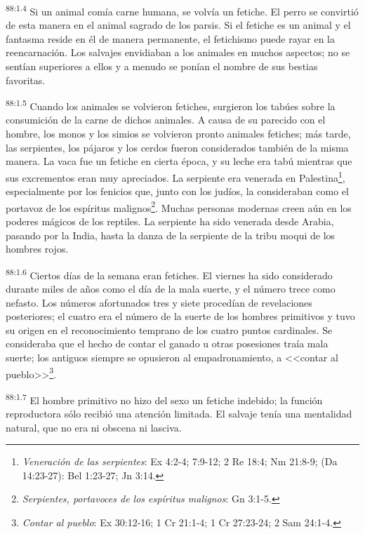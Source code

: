 \documentclass[twoside, 11pt]{book}
\begin{document}
\par
\textsuperscript{88:1.4} Si un animal comía carne humana, se volvía un fetiche. El perro se convirtió de esta manera en el animal sagrado de los parsis. Si el fetiche es un animal y el fantasma reside en él de manera permanente, el fetichismo puede rayar en la reencarnación. Los salvajes envidiaban a los animales en muchos aspectos; no se sentían superiores a ellos y a menudo se ponían el nombre de sus bestias favoritas.

\par
\textsuperscript{88:1.5} Cuando los animales se volvieron fetiches, surgieron los tabúes sobre la consumición de la carne de dichos animales. A causa de su parecido con el hombre, los monos y los simios se volvieron pronto animales fetiches; más tarde, las serpientes, los pájaros y los cerdos fueron considerados también de la misma manera. La vaca fue un fetiche en cierta época, y su leche era tabú mientras que sus excrementos eran muy apreciados. La serpiente era venerada en Palestina\footnote{\textit{Veneración de las serpientes}: Ex 4:2-4; 7:9-12; 2 Re 18:4; Nm 21:8-9; (Da 14:23-27): Bel 1:23-27; Jn 3:14.}, especialmente por los fenicios que, junto con los judíos, la consideraban como el portavoz de los espíritus malignos\footnote{\textit{Serpientes, portavoces de los espíritus malignos}: Gn 3:1-5.}. Muchas personas modernas creen aún en los poderes mágicos de los reptiles. La serpiente ha sido venerada desde Arabia, pasando por la India, hasta la danza de la serpiente de la tribu moqui de los hombres rojos.

\par
\textsuperscript{88:1.6} Ciertos días de la semana eran fetiches. El viernes ha sido considerado durante miles de años como el día de la mala suerte, y el número trece como nefasto. Los números afortunados tres y siete procedían de revelaciones posteriores; el cuatro era el número de la suerte de los hombres primitivos y tuvo su origen en el reconocimiento temprano de los cuatro puntos cardinales. Se consideraba que el hecho de contar el ganado u otras posesiones traía mala suerte; los antiguos siempre se opusieron al empadronamiento, a <<contar al pueblo>>\footnote{\textit{Contar al pueblo}: Ex 30:12-16; 1 Cr 21:1-4; 1 Cr 27:23-24; 2 Sam 24:1-4.}.

\par
\textsuperscript{88:1.7} El hombre primitivo no hizo del sexo un fetiche indebido; la función reproductora sólo recibió una atención limitada. El salvaje tenía una mentalidad natural, que no era ni obscena ni lasciva.
\end{document}
